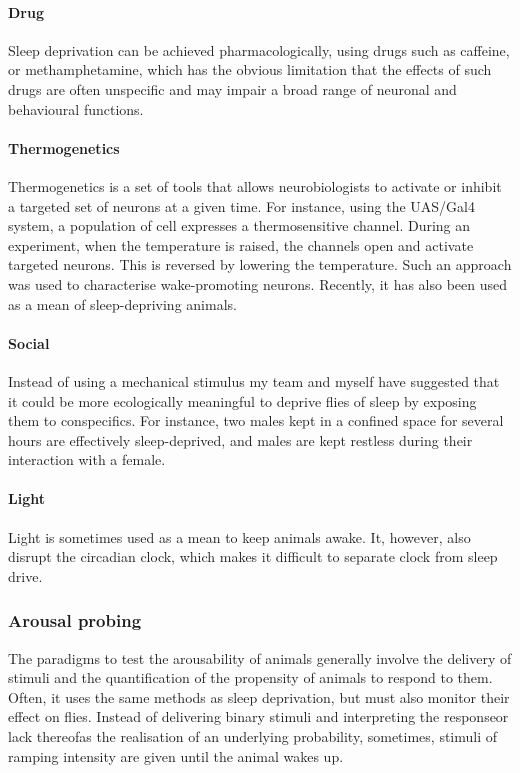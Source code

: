 \paragraph*{Drug}
Sleep deprivation can be achieved pharmacologically, using drugs such as caffeine\cite{hendricks_modafinil_2003},
or methamphetamine\cite{andretic_dopaminergic_2005}, which has the obvious limitation that the effects of such drugs are often unspecific and may impair a broad range of neuronal and behavioural functions\cite{gilestro_pysolo_2009}.

\paragraph*{Thermogenetics} 
Thermogenetics  is a set of tools that allows neurobiologists to activate or inhibit a targeted set of neurons at a given time. 
For instance, using the UAS/Gal4 system, a population of cell expresses a thermosensitive channel.
During an experiment, when the temperature is raised, the channels open and activate targeted neurons.
This is reversed by lowering the temperature\cite{hamada_internal_2008}.
Such an approach was used to characterise wake-promoting neurons\cite{donlea_inducing_2011}.
Recently, it has also been used as a mean of sleep-depriving animals\cite{seidner_identification_2015,kayser_sleep_2015,dubowy_genetic_2016}.

\paragraph*{Social}
Instead of using a mechanical stimulus my team and myself have suggested that it could be more ecologically meaningful to deprive flies of sleep by exposing them to conspecifics.
For instance, two males kept in a confined space for several hours are effectively sleep-deprived\cite{gilestro_widespread_2009,beckwith_regulation_2017}, and males are kept restless during their interaction with a female\cite{beckwith_regulation_2017}.

\paragraph*{Light}
Light is sometimes used as a mean to keep animals awake\cite{rodrigues_short-term_2018}.
It, however, also disrupt the circadian clock, which makes it difficult to separate clock from sleep drive.

\subsubsection{Arousal probing}
The paradigms to test the arousability of animals generally involve the delivery of stimuli and the quantification of the propensity of animals to respond to them.
Often, it uses the same methods as sleep deprivation, but must also monitor their effect on flies.
Instead of delivering binary stimuli and interpreting the response\emd{}or lack thereof\emd{}as the realisation of an underlying probability,
sometimes, stimuli of ramping intensity are given until the animal wakes up\cite{hendricks_rest_2000, huber_sleep_2004, faville_how_2015}.

